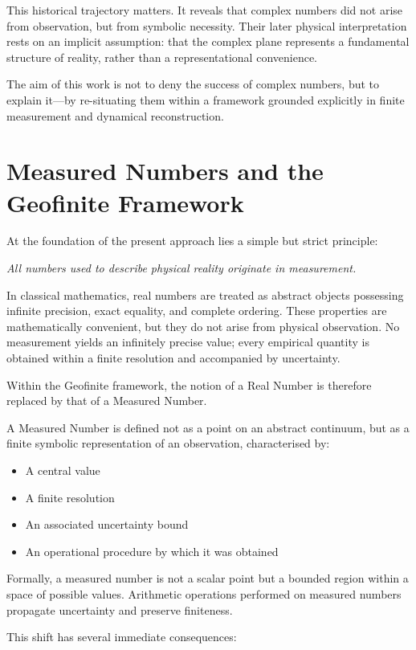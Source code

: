 \documentclass[12pt]{book}  %
\begin{document}
This historical trajectory matters. It reveals that complex numbers did not arise from observation, but from symbolic necessity. Their later physical interpretation rests on an implicit assumption: that the complex plane represents a fundamental structure of reality, rather than a representational convenience.

The aim of this work is not to deny the success of complex numbers, but to explain it—by re-situating them within a framework grounded explicitly in finite measurement and dynamical reconstruction.

\chapter{Measured Numbers and the Geofinite Framework}

At the foundation of the present approach lies a simple but strict principle:

\textit{All numbers used to describe physical reality originate in measurement.}

In classical mathematics, real numbers are treated as abstract objects possessing infinite precision, exact equality, and complete ordering. These properties are mathematically convenient, but they do not arise from physical observation. No measurement yields an infinitely precise value; every empirical quantity is obtained within a finite resolution and accompanied by uncertainty.

Within the Geofinite framework, the notion of a Real Number is therefore replaced by that of a Measured Number.

A Measured Number is defined not as a point on an abstract continuum, but as a finite symbolic representation of an observation, characterised by:

\begin{itemize}
    \item A central value
    \item A finite resolution
    \item An associated uncertainty bound
    \item An operational procedure by which it was obtained
\end{itemize}

Formally, a measured number is not a scalar point but a bounded region within a space of possible values. Arithmetic operations performed on measured numbers propagate uncertainty and preserve finiteness.

This shift has several immediate consequences:
\end{document}
